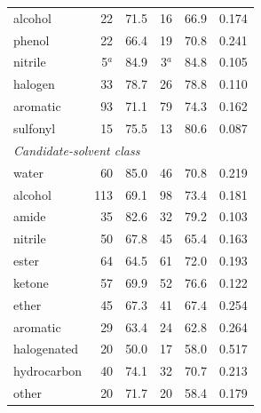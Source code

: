 \begin{longtable}{lrrrrr}
alcohol & 22 & 71.5 & 16 & 66.9 & 0.174 \\
phenol & 22 & 66.4 & 19 & 70.8 & 0.241 \\
nitrile & 5$^{a}$ & 84.9 & 3$^{a}$ & 84.8 & 0.105 \\
halogen & 33 & 78.7 & 26 & 78.8 & 0.110 \\
aromatic & 93 & 71.1 & 79 & 74.3 & 0.162 \\
sulfonyl & 15 & 75.5 & 13 & 80.6 & 0.087 \\
\multicolumn{6}{l}{\textit{Candidate-solvent class}} \\
water & 60 & 85.0 & 46 & 70.8 & 0.219 \\
alcohol & 113 & 69.1 & 98 & 73.4 & 0.181 \\
amide & 35 & 82.6 & 32 & 79.2 & 0.103 \\
nitrile & 50 & 67.8 & 45 & 65.4 & 0.163 \\
ester & 64 & 64.5 & 61 & 72.0 & 0.193 \\
ketone & 57 & 69.9 & 52 & 76.6 & 0.122 \\
ether & 45 & 67.3 & 41 & 67.4 & 0.254 \\
aromatic & 29 & 63.4 & 24 & 62.8 & 0.264 \\
halogenated & 20 & 50.0 & 17 & 58.0 & 0.517 \\
hydrocarbon & 40 & 74.1 & 32 & 70.7 & 0.213 \\
other & 20 & 71.7 & 20 & 58.4 & 0.179 \\
\bottomrule
\end{longtable}
\endgroup
